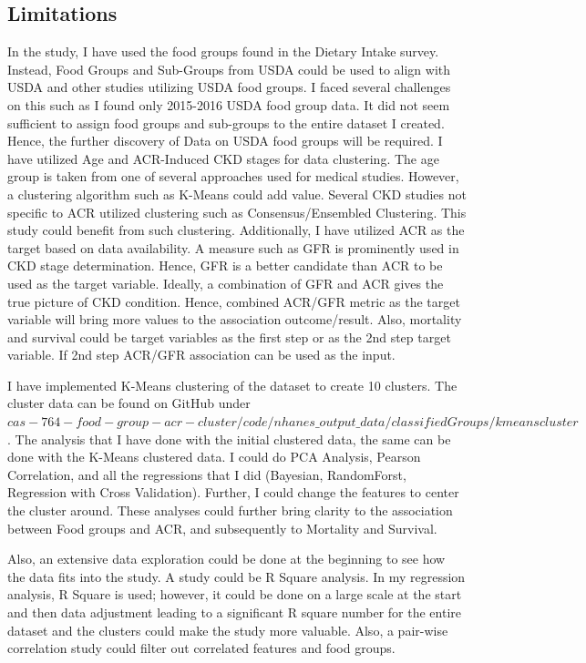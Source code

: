 \subsection {Limitations}
\flushleft \justifying In the study, I have used the food groups found in the Dietary Intake survey. Instead, Food Groups and Sub-Groups from USDA could be used to align with USDA and other studies utilizing USDA food groups. I faced several challenges on this such as I found only 2015-2016 USDA food group data. It did not seem sufficient to assign food groups and sub-groups to the entire dataset I created. Hence, the further discovery of Data on USDA food groups will be required. I have utilized Age and ACR-Induced CKD stages for data clustering. The age group is taken from one of several approaches used for medical studies. However, a clustering algorithm such as K-Means could add value. Several CKD studies not specific to ACR utilized clustering such as Consensus/Ensembled Clustering. This study could benefit from such clustering. Additionally, I have utilized ACR as the target based on data availability. A measure such as GFR is prominently used in CKD stage determination. Hence, GFR is a better candidate than ACR to be used as the target variable. Ideally, a combination of GFR and ACR gives the true picture of CKD condition. Hence, combined ACR/GFR metric as the target variable will bring more values to the association outcome/result. Also, mortality and survival could be target variables as the first step or as the 2nd step target variable. If 2nd step ACR/GFR association can be used as the input.

\flushleft \justifying I have implemented K-Means clustering of the dataset to create 10 clusters. The cluster data can be found on GitHub under $cas-764-food-group-acr-cluster/code/nhanes\_output\_data/classifiedGroups/kmeanscluster$. The analysis that I have done with the initial clustered data, the same can be done with the K-Means clustered data. I could do PCA Analysis, Pearson Correlation, and all the regressions that I did (Bayesian, RandomForst, Regression with Cross Validation). Further, I could change the features to center the cluster around. These analyses could further bring clarity to the association between Food groups and ACR, and subsequently to Mortality and Survival.

\flushleft \justifying  Also, an extensive data exploration could be done at the beginning to see how the data fits into the study. A study could be R Square analysis. In my regression analysis, R Square is used; however, it could be done on a large scale at the start and then data adjustment leading to a significant R square number for the entire dataset and the clusters could make the study more valuable. Also, a pair-wise correlation study could filter out correlated features and food groups.

